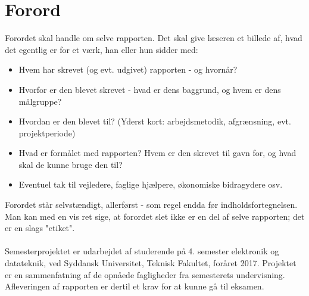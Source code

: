 \chapter*{Forord}\label{chap:forord}




Forordet skal handle om selve rapporten. Det skal give læseren et billede af, hvad det egentlig er for et værk, han eller hun sidder med:

\begin{itemize}
	\item Hvem har skrevet (og evt. udgivet) rapporten - og hvornår?
	\item Hvorfor er den blevet skrevet - hvad er dens baggrund, og hvem er dens målgruppe?
	\item Hvordan er den blevet til? (Yderst kort: arbejdsmetodik, afgrænsning, evt. projektperiode)
	\item Hvad er formålet med rapporten? Hvem er den skrevet til gavn for, og hvad skal de kunne bruge den til?
	\item Eventuel tak til vejledere, faglige hjælpere, økonomiske bidragydere osv.
\end{itemize}

Forordet står selvstændigt, allerførst - som regel endda før indholdsfortegnelsen. Man kan med en vis ret sige, at forordet slet ikke er en del af selve rapporten; det er en slags "etiket".\\ \\

Semesterprojektet er udarbejdet af studerende på 4. semester elektronik og datateknik, ved Syddansk Universitet, Teknisk Fakultet, foråret 2017. Projektet er en sammenfatning af de opnåede fagligheder fra semesterets undervisning. Afleveringen af rapporten er dertil et krav for at kunne gå til eksamen.
\\ \\

